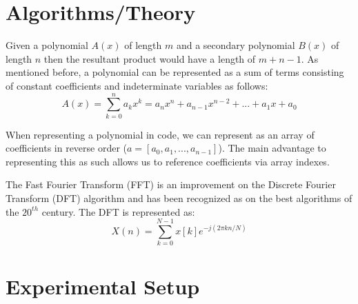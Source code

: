 \documentclass[12pt]{article}
\begin{document}
        \section{Algorithms/Theory}
        \indent\par{Given a polynomial $A(x)$ of length $m$ and a secondary polynomial $B(x)$ of length $n$ then the resultant product would have a length of $m+n-1$. As mentioned before, a polynomial can be represented as a sum of terms consisting of constant coefficients and indeterminate variables as follows: }
        $$A(x) = \sum_{k=0}^{n}a_kx^k = a_nx^n + a_{n-1}x^{n-2} + ... + a_1x + a_0$$
        \indent\par{When representing a polynomial in code, we can represent as an array of coefficients in reverse order ($a = [a_0,a_1,...,a_{n-1}]$). The main advantage to representing this as such allows us to reference coefficients via array indexes. }
        \indent\par{The Fast Fourier Transform (FFT) is an improvement on the Discrete Fourier Transform (DFT) algorithm and has been recognized as on the best algorithms of the $20^{th}$ century\cite{dongarra2000guest}. The DFT is represented as: }
        $$X(n)=\sum_{k=0}^{N-1}x[k]e^{-j(2\pi kn/N)}$$
        \section{Experimental Setup}
\end{document}
